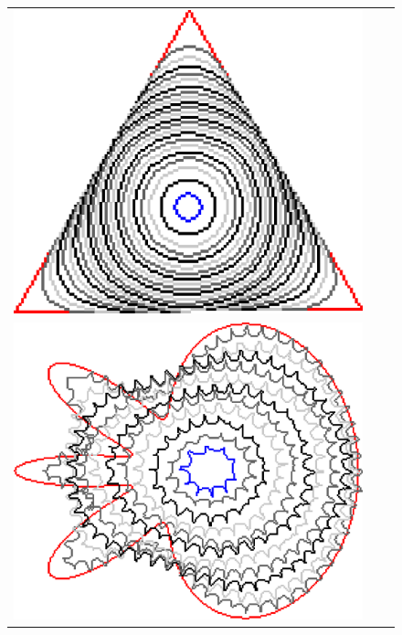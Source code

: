 \begin{figure}
\begin{tabular}{ccc}
\includegraphics[scale=0.22]{figures/chapter6/level-effect/triangle/improve/len_pen0/radius-9/level9/summary.pdf}\\[2em]
\includegraphics[scale=0.22]{figures/chapter6/level-effect/flower/improve/len_pen0/radius-9/level1/summary.pdf} &

\end{tabular}
\end{figure}
